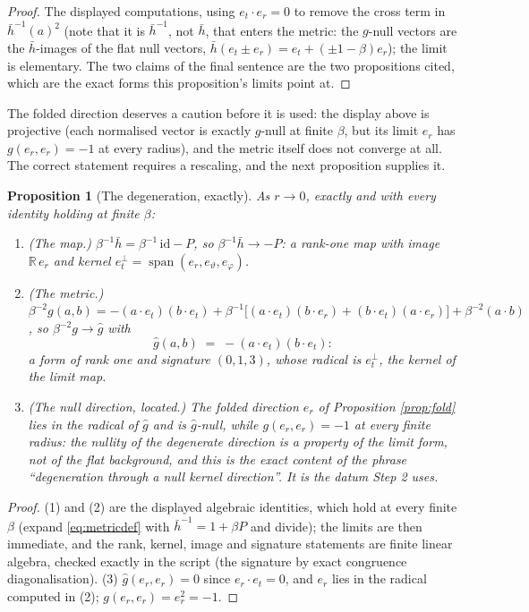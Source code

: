\documentclass[11pt]{article}
\newtheorem{proposition}[theorem]{Proposition}
\theoremstyle{definition}
\newcommand{\R}{\mathbb{R}}
\newcommand{\hb}{\bar{h}}
\newcommand{\er}{e_r}
\newcommand{\et}{e_t}
\begin{document}
\begin{proof}
The displayed computations, using $\et \cdot \er = 0$ to remove the cross term in $\hb^{-1}(a)^{2}$ (note that it is $\hb^{-1}$, not $\hb$, that enters the metric: the $g$-null vectors are the $\hb$-images of the flat null vectors, $\hb(\et \pm \er) = \et + (\pm 1 - \beta)\er$); the limit is elementary. The two claims of the final sentence are the two propositions cited, which are the exact forms this proposition's limits point at.
\end{proof}

The folded direction deserves a caution before it is used: the display above is projective (each normalised vector is exactly $g$-null at finite $\beta$, but its limit $\er$ has $g(\er, \er) = -1$ at every radius), and the metric itself does not converge at all. The correct statement requires a rescaling, and the next proposition supplies it.

\begin{proposition}[The degeneration, exactly]\label{prop:limit}
As $r \to 0$, exactly and with every identity holding at finite $\beta$:
\begin{enumerate}
\item (The map.) $\beta^{-1}\hb = \beta^{-1}\,\mathrm{id} - P$, so $\beta^{-1}\hb \to -P$: a rank-one map with image $\R\,\er$ and kernel $\et^{\perp} = \operatorname{span}(\er, e_\vartheta, e_\varphi)$.
\item (The metric.) $\beta^{-2} g(a,b) = -(a\cdot\et)(b\cdot\et) + \beta^{-1}\bigl[(a\cdot\et)(b\cdot\er) + (b\cdot\et)(a\cdot\er)\bigr] + \beta^{-2}(a \cdot b)$, so $\beta^{-2}g \to \hat g$ with
\[
\hat g(a,b) \;=\; -(a\cdot\et)(b\cdot\et) :
\]
a form of rank one and signature $(0,1,3)$, whose radical is $\et^{\perp}$, the kernel of the limit map.
\item (The null direction, located.) The folded direction $\er$ of Proposition \ref{prop:fold} lies in the radical of $\hat g$ and is $\hat g$-null, while $g(\er,\er) = -1$ at every finite radius: the nullity of the degenerate direction is a property of the limit form, not of the flat background, and this is the exact content of the phrase ``degeneration through a null kernel direction''. It is the datum Step 2 uses.
\end{enumerate}
\end{proposition}

\begin{proof}
(1) and (2) are the displayed algebraic identities, which hold at every finite $\beta$ (expand \eqref{eq:metricdef} with $\hb^{-1} = 1 + \beta P$ and divide); the limits are then immediate, and the rank, kernel, image and signature statements are finite linear algebra, checked exactly in the script (the signature by exact congruence diagonalisation). (3) $\hat g(\er, \er) = 0$ since $\er \cdot \et = 0$, and $\er$ lies in the radical computed in (2); $g(\er,\er) = \er^2 = -1$.
\end{proof}
\end{document}
